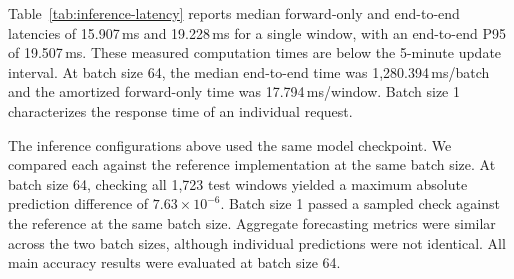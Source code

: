 Table~\ref{tab:inference-latency} reports median forward-only and end-to-end latencies of 15.907\,ms and 19.228\,ms for a single window, with an end-to-end P95 of 19.507\,ms. These measured computation times are below the 5-minute update interval. At batch size 64, the median end-to-end time was 1,280.394\,ms/batch and the amortized forward-only time was 17.794\,ms/window. Batch size 1 characterizes the response time of an individual request.

The inference configurations above used the same model checkpoint. We compared each against the reference implementation at the same batch size. At batch size 64, checking all 1,723 test windows yielded a maximum absolute prediction difference of \(7.63\times10^{-6}\). Batch size 1 passed a sampled check against the reference at the same batch size. Aggregate forecasting metrics were similar across the two batch sizes, although individual predictions were not identical. All main accuracy results were evaluated at batch size 64.

\FloatBarrier

